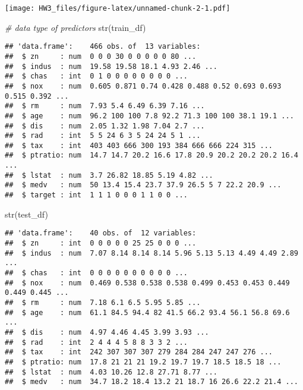 \documentclass[
]{article}
\newenvironment{Shaded}{\begin{snugshade}}{\end{snugshade}}
\newcommand{\CommentTok}[1]{\textcolor[rgb]{0.56,0.35,0.01}{\textit{#1}}}
\newcommand{\FunctionTok}[1]{\textcolor[rgb]{0.00,0.00,0.00}{#1}}
\newcommand{\NormalTok}[1]{#1}
\begin{document}
\texttt{[image: HW3\_files/figure-latex/unnamed-chunk-2-1.pdf]}

\begin{Shaded}
\begin{Highlighting}[]
\CommentTok{\# data type of predictors}
\FunctionTok{str}\NormalTok{(train\_df)}
\end{Highlighting}
\end{Shaded}

\begin{verbatim}
## 'data.frame':    466 obs. of  13 variables:
##  $ zn     : num  0 0 0 30 0 0 0 0 0 80 ...
##  $ indus  : num  19.58 19.58 18.1 4.93 2.46 ...
##  $ chas   : int  0 1 0 0 0 0 0 0 0 0 ...
##  $ nox    : num  0.605 0.871 0.74 0.428 0.488 0.52 0.693 0.693 0.515 0.392 ...
##  $ rm     : num  7.93 5.4 6.49 6.39 7.16 ...
##  $ age    : num  96.2 100 100 7.8 92.2 71.3 100 100 38.1 19.1 ...
##  $ dis    : num  2.05 1.32 1.98 7.04 2.7 ...
##  $ rad    : int  5 5 24 6 3 5 24 24 5 1 ...
##  $ tax    : int  403 403 666 300 193 384 666 666 224 315 ...
##  $ ptratio: num  14.7 14.7 20.2 16.6 17.8 20.9 20.2 20.2 20.2 16.4 ...
##  $ lstat  : num  3.7 26.82 18.85 5.19 4.82 ...
##  $ medv   : num  50 13.4 15.4 23.7 37.9 26.5 5 7 22.2 20.9 ...
##  $ target : int  1 1 1 0 0 0 1 1 0 0 ...
\end{verbatim}

\begin{Shaded}
\begin{Highlighting}[]
\FunctionTok{str}\NormalTok{(test\_df)}
\end{Highlighting}
\end{Shaded}

\begin{verbatim}
## 'data.frame':    40 obs. of  12 variables:
##  $ zn     : int  0 0 0 0 0 25 25 0 0 0 ...
##  $ indus  : num  7.07 8.14 8.14 8.14 5.96 5.13 5.13 4.49 4.49 2.89 ...
##  $ chas   : int  0 0 0 0 0 0 0 0 0 0 ...
##  $ nox    : num  0.469 0.538 0.538 0.538 0.499 0.453 0.453 0.449 0.449 0.445 ...
##  $ rm     : num  7.18 6.1 6.5 5.95 5.85 ...
##  $ age    : num  61.1 84.5 94.4 82 41.5 66.2 93.4 56.1 56.8 69.6 ...
##  $ dis    : num  4.97 4.46 4.45 3.99 3.93 ...
##  $ rad    : int  2 4 4 4 5 8 8 3 3 2 ...
##  $ tax    : int  242 307 307 307 279 284 284 247 247 276 ...
##  $ ptratio: num  17.8 21 21 21 19.2 19.7 19.7 18.5 18.5 18 ...
##  $ lstat  : num  4.03 10.26 12.8 27.71 8.77 ...
##  $ medv   : num  34.7 18.2 18.4 13.2 21 18.7 16 26.6 22.2 21.4 ...
\end{verbatim}
\end{document}
